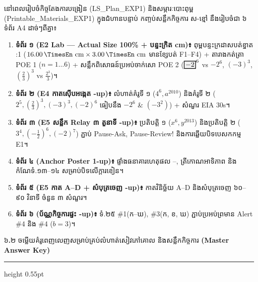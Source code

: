 \documentclass[a4paper,12pt]{article}
\newcommand{\en}[1]{{\TimesEn #1}}
\newcommand{\enbf}[1]{{\TimesEn\textbf{#1}}}
\newcommand{\unit}[1]{\,\text{\en{#1}}}
\newcommand{\cnum}[1]{{\TimesEn\fontsize{10.5pt}{12pt}\selectfont\ding{\numexpr181+#1\relax}}}
\newcommand{\lockbox}[1]{\tikz[baseline=(X.base)]\node[draw=black, line width=0.85pt, fill=panelgray, inner sep=1.8pt, anchor=base] (X) {$#1$};}
\newcommand{\subsectitle}[1]{{\muol\fontsize{11.5pt}{15.5pt}\selectfont #1}}
\newcommand{\subsec}[1]{%
  \Needspace{1.6cm}%
  \vspace{2pt}%
  \subsectitle{#1}\par%
  \vspace{-2pt}%
  {\color{black}\hrule height 0.55pt}%
  \vspace{2pt}%
}
\begin{document}
នៅពេលរៀបចំកិច្ចតែងការបង្រៀន (\en{LS\_Plan\_EXP1}) និងសម្ភារៈបោះពុម្ព (\en{Printable\_Materials\_EXP1}) ក្នុងជំហានបន្ទាប់ កញ្ចប់សន្លឹកកិច្ចការ ស-ខ្មៅ នឹងរៀបចំជា ៦ ទំព័រ \en{A4} ដាច់ៗពីគ្នា៖
\begin{enumerate}[leftmargin=0.65cm, itemsep=1.5pt]
  \item \textbf{ទំព័រ ១ (\en{E2 Lab — Actual Size 100\%} + បន្ទះក្រិត \en{5.00 cm})៖} ពុម្ពបន្ទះក្រដាសបត់ខ្នាត \en{1:1} ($16.00\unit{cm}\times 3.00\unit{cm}$ មានខ្សែបត់ \en{F1--F4}) + តារាងកត់ត្រា \en{POE 1} ($n=1\dots 6$) + សន្លឹកពិសោធន៍ប្រអប់ចាក់សោ \en{POE 2} ($\lockbox{-2}^6$ \en{vs} $-2^6$, $(-3)^3$, $(\frac{2}{3})^3$ \en{vs} $\frac{2^3}{3}$)។
  \item \textbf{ទំព័រ ២ (\en{E4} កាតស៊ើបអង្កេត \en{2-up})៖} លំហាត់គំរូទី ១ ($4^6, a^{2010}$) និងគំរូទី ២ ($2^5, (\frac{2}{3})^3, (-3)^3, (-2)^6$ ធៀបនឹង $-2^6$ \en{\&} $(-3^2)$) + សំណួរ \en{EIA 30s}។
  \item \textbf{ទំព័រ ៣ (\en{E5} សន្លឹក \en{Relay} ៣ តួនាទី \en{2-up})៖} ប្រតិបត្តិ ១ ($x^6, y^{2013}$) និងប្រតិបត្តិ ២ ($3^4, (-\frac{1}{2})^6, (-2)^7$) ភ្ជាប់ \en{Pause-Ask}, \en{Pause-Review!} និងការឆ្លើយបិទបេសកកម្ម \en{E1}។
  \item \textbf{ទំព័រ ៤ (\en{Anchor Poster 1-up})៖} ផ្ទាំងធនាគារហេតុផល \cnum{1}\en{--}\cnum{5}, ត្រីកោណអាទិភាព និងកំណែទំ\en{.}១៣\en{--}១៤ សម្រាប់បិទលើក្ដារខៀន។
  \item \textbf{ទំព័រ ៥ (\en{E5} កាត \en{A--D} + សំបុត្រចេញ \en{2-up})៖} កាតវិនិច្ឆ័យ \en{A--D} និងសំបុត្រចេញ ៦០\en{--}៩០ វិនាទី ចំនួន ៣ សំណួរ។
  \item \textbf{ទំព័រ ៦ (ប័ណ្ណកិច្ចការផ្ទះ \en{4-up})៖} ទំ\en{.}២៥ \en{\#1}(ក\en{--}ឃ), \en{\#3}(ក\en{,} ខ\en{,} ឃ) ភ្ជាប់ប្រអប់ព្រមាន \en{Alert \#4} និង \en{\#4} ($b=3$)។
\end{enumerate}

\subsec{៦\enbf{.}២ ចម្លើយគំរូពេញលេញសម្រាប់គ្រប់លំហាត់សៀវភៅគោល និងសន្លឹកកិច្ចការ \enbf{(Master Answer Key)}}
\end{document}
